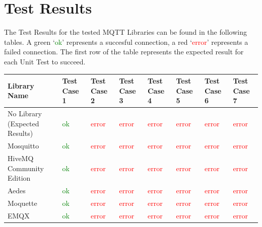 \documentclass[binding=0.6cm,noexaminfo]{sapthesis}
\begin{document}
\chapter{Test Results}
The Test Results for the tested MQTT Libraries can be found in the following tables. A green `\textcolor{green}{ok}' represents a succesful connection, a red `\textcolor{red}{error}' represents a failed connection. The first row of the table represents the expected result for each Unit Test to succeed.

\begin{flushleft}
\begin{tabular}{| p{2cm} | p{1.5cm} | p{1.5cm} | p{1.5cm} | p{1.5cm} | p{1.5cm} | p{1.5cm} | p{1.5cm} |}
\hline
\bf Library Name & \bf Test Case 1 & \bf Test Case 2 & \bf Test Case 3 & \bf Test Case 4 & \bf Test Case 5 & \bf Test Case 6 & \bf Test Case 7 \\
\hline
No Library (Expected Results) & \textcolor{green}{ok} & \textcolor{red}{error} & \textcolor{red}{error} & \textcolor{red}{error} & \textcolor{red}{error} & \textcolor{red}{error} & \textcolor{red}{error} \\
\hline
Mosquitto & \textcolor{green}{ok} & \textcolor{red}{error} & \textcolor{red}{error} & \textcolor{red}{error} & \textcolor{red}{error} & \textcolor{red}{error} & \textcolor{red}{error} \\
\hline
HiveMQ Community Edition & \textcolor{green}{ok} & \textcolor{red}{error} & \textcolor{red}{error} & \textcolor{red}{error} & \textcolor{red}{error} & \textcolor{red}{error} & \textcolor{red}{error} \\
\hline
Aedes & \textcolor{green}{ok} & \textcolor{red}{error} & \textcolor{red}{error} & \textcolor{red}{error} & \textcolor{red}{error} & \textcolor{red}{error} & \textcolor{red}{error} \\
\hline
Moquette & \textcolor{green}{ok} & \textcolor{red}{error} & \textcolor{red}{error} & \textcolor{red}{error} & \textcolor{red}{error} & \textcolor{red}{error} & \textcolor{red}{error} \\
\hline
EMQX & \textcolor{green}{ok} & \textcolor{red}{error} & \textcolor{red}{error} & \textcolor{red}{error} & \textcolor{red}{error} & \textcolor{red}{error} & \textcolor{red}{error} \\
\hline
\end{tabular}
\end{flushleft}
\end{document}
